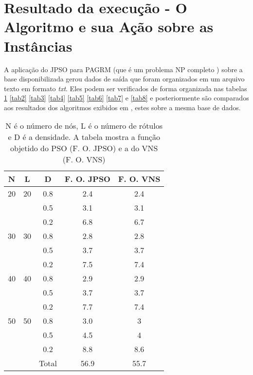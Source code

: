 \documentclass{sig-alternate-05-2015}
\begin{document}
\section*{Resultado da execução - O Algoritmo e sua Ação sobre as Instâncias} \label{sec4}
A aplicação do JPSO para PAGRM (que é um problema NP completo \cite{Ladner:1975:SPT:321864.321877}) sobre a base disponibilizada gerou dados de saída que foram organizados em um arquivo texto em formato \textit{txt}. Eles podem ser verificados de forma organizada nas tabelas  \ref{tab1} \ref{tab2} \ref{tab3} \ref{tab4} \ref{tab5} \ref{tab6} \ref{tab7} e \ref{tab8} e posteriormente são comparados aos resultados dos algoritmos exibidos em \cite{consoli2009greedy}, estes sobre a mesma base de dados. 
\begin{table}
        

\begin{tabular}{ccccc}

        \hline \rule[-2ex]{0pt}{5.5ex} N & L & D & F. O. JPSO & F. O. VNS \\ 
        \hline \rule[-2ex]{0pt}{5.5ex} 20 & 20 & 0.8 & 2.4 & 2.4 \\ 
         \rule[-2ex]{0pt}{5.5ex}  &  & 0.5 & 3.1 & 3.1\\ 
         \rule[-2ex]{0pt}{5.5ex}  &  & 0.2 & 6.8 & 6.7\\
         \rule[-2ex]{0pt}{5.5ex} 30 & 30 & 0.8 & 2.8 & 2.8\\ 
         \rule[-2ex]{0pt}{5.5ex}  &  & 0.5 & 3.7 & 3.7\\
         \rule[-2ex]{0pt}{5.5ex}  &  & 0.2 & 7.5 & 7.4\\
         \rule[-2ex]{0pt}{5.5ex} 40 & 40 & 0.8 & 2.9 & 2.9\\ 
         \rule[-2ex]{0pt}{5.5ex}  &  & 0.5 & 3.7 & 3.7\\  
         \rule[-2ex]{0pt}{5.5ex}  &  & 0.2 & 7.7 & 7.4\\
         \rule[-2ex]{0pt}{5.5ex} 50 & 50 & 0.8 & 3.0 & 3\\
         \rule[-2ex]{0pt}{5.5ex}  &  & 0.5 & 4.5 & 4\\
         \rule[-2ex]{0pt}{5.5ex}  &  & 0.2 & 8.8 & 8.6\\
        \hline \rule[-2ex]{0pt}{5.5ex}  &  & Total & 56.9 &  55.7 \\
        \hline
        
\end{tabular}



\caption{N é o número de nós, L é o número de rótulos e D é a densidade.  A tabela mostra a função objetido do PSO (F. O. JPSO) e a do VNS (F. O. VNS)}
\label{tab1}
\end{table}
\end{document}
